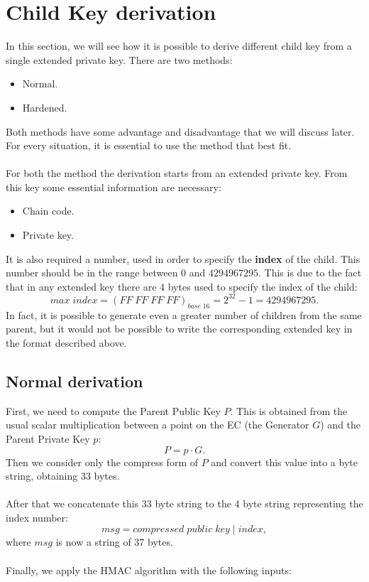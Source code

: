 \section{Child Key derivation}
In this section, we will see how it is possible to derive different child key from a single extended private key. There are two methods:
\begin{itemize}
	\item Normal.
	\item Hardened.
\end{itemize}
Both methods have some advantage and disadvantage that we will discuss later. For every situation, it is essential to use the method that best fit.
\\ \\
For both the method the derivation starts from an extended private key. From this key some essential information are necessary:
\begin{itemize}[label=$\star$]
	\item Chain code.
	\item Private key.
\end{itemize}
It is also required a number, used in order to specify the \textbf{index} of the child. This number should be in the range between $0$ and $4294967295$. This is due to the fact that in any extended key there are 4 bytes used to specify the index of the child:
\begin{equation*}
max \; index=(FF\;FF\;FF\;FF)_{base \; 16} = 2^{32}-1 = 4294967295.
\end{equation*}
In fact, it is possible to generate even a greater number of children from the same parent, but it would not be possible to write the corresponding extended key in the format described above.


\subsection{Normal derivation}

First, we need to compute the Parent Public Key $P$. This is obtained from the usual scalar multiplication between a point on the EC (the Generator $G$) and the Parent Private Key $p$:
\begin{equation*}
P=p\cdot G.
\end{equation*}
Then we consider only the compress form of $P$ and convert this value into a byte string, obtaining 33 bytes.
\\ \\
After that we concatenate this 33 byte string to the 4 byte string representing the index number:
\begin{equation*}
msg = compressed \; public\;key \;|\; index,
\end{equation*}
where $msg$ is now a string of $37$ bytes. \\ \\
Finally, we apply the HMAC algorithm with the following inputs:

